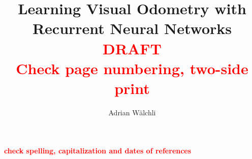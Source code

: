 \documentclass[a4paper]{report}
\newcommand{\todo}[1]{{\large \textbf{\textcolor{red}{#1}}}}
\begin{document}
	\pagestyle{fancyplain} \thispagestyle{empty}
	
	\title{Learning Visual Odometry with Recurrent Neural Networks \\ \todo{DRAFT} \\ \todo{Check page numbering, two-side print}}
	\author{Adrian W\"alchli}
	
	 \setcounter{page}{1}
	\maketitle
	
	
	\newpage{\pagestyle{empty} \cleardoublepage}
	
	
	\newpage{\pagestyle{empty} \cleardoublepage}
	
	 \setcounter{page}{1}
	
	\tableofcontents
	\newpage{\pagestyle{empty} \cleardoublepage}
	
	 \setcounter{page}{1}
	\pagestyle{fancy}
	
	
	\newpage{\pagestyle{empty} \cleardoublepage}
	
	
	\newpage{\pagestyle{empty} \cleardoublepage}
	
	
	\newpage{\pagestyle{empty} \cleardoublepage}
	
	
	\newpage{\pagestyle{empty} \cleardoublepage}
	
	
	\newpage{\pagestyle{empty} \cleardoublepage}
	
	
	\newpage{\pagestyle{empty} \cleardoublepage}
	
	
	\begin{appendix}
		
		\newpage{\pagestyle{empty} \cleardoublepage}
	\end{appendix}
	
	\listoftables
	
	\listoffigures
	
	\nocite{*}
	
	\todo{check spelling, capitalization and dates of references}
	
	
\end{document}
